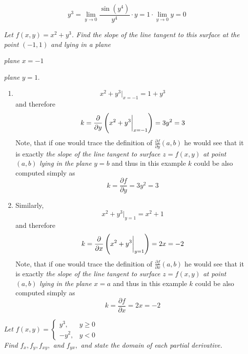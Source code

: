 \documentclass[8pt]{article} %
\begin{document}
\begin{description}
{\[		{y^3}=\lim_{y\to0}\frac{\sin(y^4)}{y^4}\cdot y=1\cdot\lim_{y\to 0}y=0\]
		}
	\item[\# 62.]{{\it Let $f(x,y)=x^2+y^3$. Find the slope of the line tangent to this surface at the point $(-1,1)$ and lying in a plane}
		\begin{inparaenum}[\bfseries a.]\item \textit{plane} $x=-1$\quad\item \textit{plane} $y=1$.\end{inparaenum}
		\begin{enumerate}[\bfseries a.]
			\item \[x^2+y^3\bigg|_{x=-1}=1+y^3\]
				and therefore
				\[k=\frac{\partial}{\partial y}\left(x^2+y^3\bigg|_{x=-1}\right)=3y^2=3\]
				Note, that if one would trace the definition of $\frac{
				\partial f}{\partial y}(a,b)$ he would see that it is exactly {\it
				the slope of the line tangent to surface $z=f(x,y)$ at point $(a,b)$ lying in the plane $y=b$} and thus in this
				example $k$ could be also computed simply as
				\[k=\frac{\partial f}{\partial y}=3y^2=3\]
			\item Similarly,
				\[x^2+y^3\bigg|_{y=1}=x^2+1\]
				and therefore
				\[k=\frac{\partial}{\partial x}\left(x^2+y^3\bigg|_{y=1}\right)=2x=-2\]
				Note, that if one would trace the definition of $\frac{\partial f}{\partial x}
				(a,b)$ he would see that it is exactly {\it
				the slope of the line tangent to surface $z=f(x,y)$ at point $(a,b)$ lying in the plane $x=a$} and thus in this
				example $k$ could be also computed simply as
				\[k=\frac{\partial f}{\partial x}=2x=-2\]
		\end{enumerate}
		}
	\item[\# 71.]{{\it Let $f(x,y)=\left\{\begin{array}{ll}y^3,&y\geq 0\\-y^2,&y<0\end{array}\right.$\\Find $f_x,f_y,f_{xy},$ and $f_{yx},$ and
			state the domain of each partial derivative.}
		}
\end{description}
\end{document}
